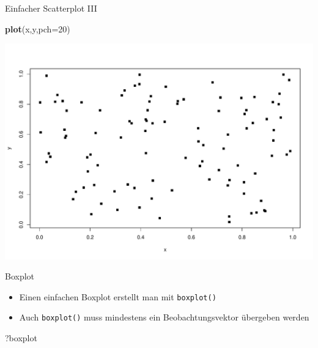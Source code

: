 \documentclass[ignorenonframetext,]{beamer}
\newenvironment{Shaded}{}{}
\newcommand{\KeywordTok}[1]{\textcolor[rgb]{0.00,0.44,0.13}{\textbf{{#1}}}}
\newcommand{\DataTypeTok}[1]{\textcolor[rgb]{0.56,0.13,0.00}{{#1}}}
\newcommand{\DecValTok}[1]{\textcolor[rgb]{0.25,0.63,0.44}{{#1}}}
\newcommand{\NormalTok}[1]{{#1}}
\providecommand{\tightlist}{%
\setlength{\itemsep}{0pt}\setlength{\parskip}{0pt}}
\begin{document}
\begin{frame}[fragile]{Einfacher Scatterplot III}

\begin{Shaded}
\begin{Highlighting}[]
\KeywordTok{plot}\NormalTok{(x,y,}\DataTypeTok{pch=}\DecValTok{20}\NormalTok{)}
\end{Highlighting}
\end{Shaded}

\includegraphics{R_intern_files/figure-beamer/unnamed-chunk-163-1.pdf}

\end{frame}

\begin{frame}[fragile]{Boxplot}

\begin{itemize}
\tightlist
\item
  Einen einfachen Boxplot erstellt man mit \texttt{boxplot()}
\item
  Auch \texttt{boxplot()} muss mindestens ein Beobachtungsvektor
  übergeben werden
\end{itemize}

\begin{Shaded}
\begin{Highlighting}[]
\NormalTok{?boxplot}
\end{Highlighting}
\end{Shaded}

\end{frame}
\end{document}
